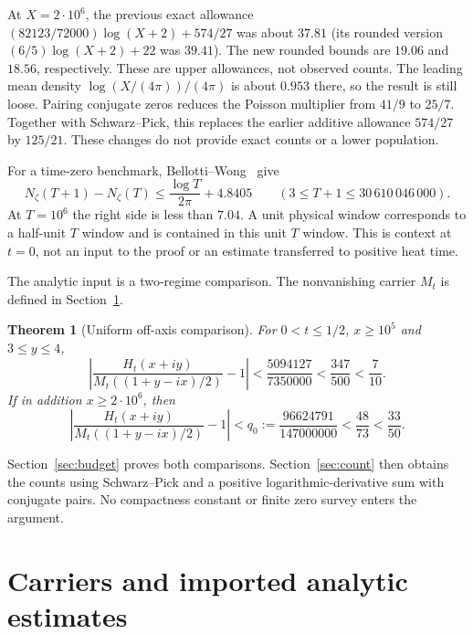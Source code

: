 \documentclass[11pt]{article}
\newtheorem{theorem}{Theorem}[section]
\theoremstyle{remark}
\newcommand{\abs}[1]{\left\lvert#1\right\rvert}
\numberwithin{equation}{section}
\begin{document}
At $X=2\cdot10^6$, the previous exact allowance
$(82123/72000)\log(X+2)+574/27$ was about $37.81$ (its rounded version
$(6/5)\log(X+2)+22$ was $39.41$). The new rounded bounds are $19.06$
and $18.56$, respectively. These are upper allowances, not observed
counts. The leading mean density
$\log(X/(4\pi))/(4\pi)$ is about $0.953$ there, so the result is still
loose. Pairing conjugate zeros reduces the Poisson multiplier from
$41/9$ to $25/7$. Together with Schwarz--Pick, this replaces the earlier
additive allowance $574/27$ by $125/21$. These changes do not provide exact
counts or a lower population.

For a time-zero benchmark, Bellotti--Wong~\cite[Corollary 1.6]{bellotti-wong}
give
\[
 N_\zeta(T+1)-N_\zeta(T)\le\frac{\log T}{2\pi}+4.8405
 \qquad(3\le T+1\le30\,610\,046\,000).
\]
At $T=10^6$ the right side is less than $7.04$. A unit physical window
corresponds to a half-unit $T$ window and is contained in this unit
$T$ window. This is context at $t=0$, not an input to the proof or an
estimate transferred to positive heat time.

The analytic input is a two-regime comparison. The nonvanishing carrier
$M_t$ is defined in Section~\ref{sec:inputs}.
\begin{theorem}[Uniform off-axis comparison]\label{thm:comparison}
For $0<t\le1/2$, $x\ge10^5$ and $3\le y\le4$,
\begin{equation}\label{eq:comparison}
 \abs{\frac{H_t(x+iy)}{M_t((1+y-ix)/2)}-1}
 <\frac{5094127}{7350000}<\frac{347}{500}<\frac7{10}.
\end{equation}
If in addition $x\ge2\cdot10^6$, then
\begin{equation}\label{eq:comparison-high}
 \abs{\frac{H_t(x+iy)}{M_t((1+y-ix)/2)}-1}
 <q_0:=\frac{96624791}{147000000}<\frac{48}{73}<\frac{33}{50}.
\end{equation}
\end{theorem}

Section~\ref{sec:budget} proves both comparisons.
Section~\ref{sec:count} then obtains the counts using Schwarz--Pick
and a positive logarithmic-derivative sum with conjugate pairs.
No compactness constant or finite zero survey enters the argument.

\section{Carriers and imported analytic estimates}\label{sec:inputs}
\end{document}
